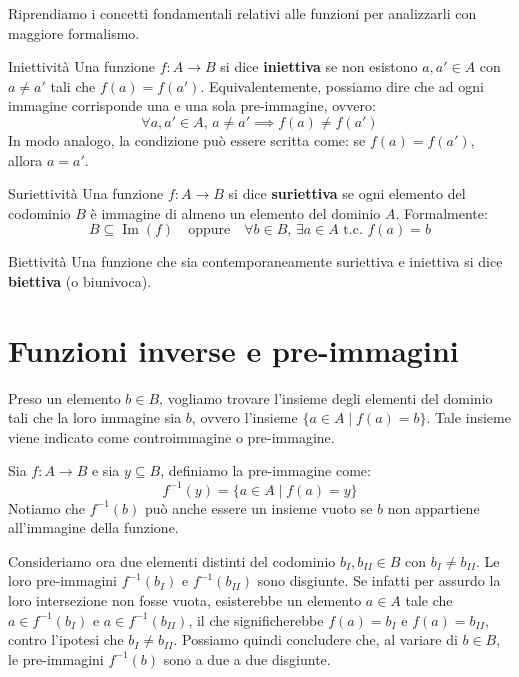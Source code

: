 \documentclass[12pt]{report}
\begin{document}
	Riprendiamo i concetti fondamentali relativi alle funzioni per analizzarli con maggiore formalismo.
	
	\begin{definizione}{Iniettività}{}
		Una funzione $f: A \to B$ si dice \textbf{iniettiva} se non esistono $a, a' \in A$ con $a \neq a'$ tali che $f(a) = f(a')$.
		Equivalentemente, possiamo dire che ad ogni immagine corrisponde una e una sola pre-immagine, ovvero:
		\[
		\forall a, a' \in A, \, a \neq a' \implies f(a) \neq f(a')
		\]
		In modo analogo, la condizione può essere scritta come: se $f(a) = f(a')$, allora $a = a'$.
	\end{definizione}
	
	\begin{definizione}{Suriettività}{}
		Una funzione $f: A \to B$ si dice \textbf{suriettiva} se ogni elemento del codominio $B$ è immagine di almeno un elemento del dominio $A$. Formalmente:
		\[
		B \subseteq \operatorname{Im}(f) \quad \text{oppure} \quad \forall b \in B, \, \exists a \in A \text{ t.c. } f(a) = b
		\]
	\end{definizione}
	
	\begin{definizione}{Biettività}{}
		Una funzione che sia contemporaneamente suriettiva e iniettiva si dice \textbf{biettiva} (o biunivoca).
	\end{definizione}
	
	\section{Funzioni inverse e pre-immagini}
	
	Preso un elemento $b \in B$, vogliamo trovare l'insieme degli elementi del dominio tali che la loro immagine sia $b$, ovvero l'insieme $\{a \in A \mid f(a) = b\}$.
	Tale insieme viene indicato come controimmagine o pre-immagine. 
	
	Sia $f: A \to B$ e sia $y \subseteq B$, definiamo la pre-immagine come:
	\[
	f^{-1}(y) = \{a \in A \mid f(a) = y\}
	\]
	Notiamo che $f^{-1}(b)$ può anche essere un insieme vuoto se $b$ non appartiene all'immagine della funzione.
	
	Consideriamo ora due elementi distinti del codominio $b_I, b_{II} \in B$ con $b_I \neq b_{II}$. Le loro pre-immagini $f^{-1}(b_I)$ e $f^{-1}(b_{II})$ sono disgiunte. Se infatti per assurdo la loro intersezione non fosse vuota, esisterebbe un elemento $a \in A$ tale che $a \in f^{-1}(b_I)$ e $a \in f^{-1}(b_{II})$, il che significherebbe $f(a) = b_I$ e $f(a) = b_{II}$, contro l'ipotesi che $b_I \neq b_{II}$.
	Possiamo quindi concludere che, al variare di $b \in B$, le pre-immagini $f^{-1}(b)$ sono a due a due disgiunte.
	
\end{document}
